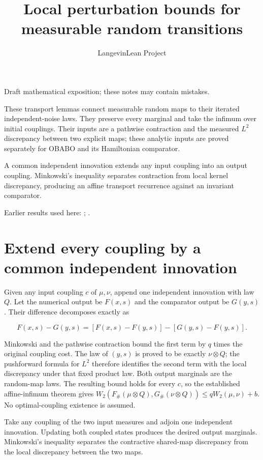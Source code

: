 \documentclass[11pt,a4paper]{article}
\title{\texorpdfstring{Local perturbation bounds for measurable random transitions}{Local perturbation bounds for measurable random transitions}}
\author{LangevinLean Project}
\date{}
\begin{document}
\maketitle
Draft mathematical exposition; these notes may contain mistakes.


These transport lemmas connect measurable random maps to their iterated independent-noise laws. They preserve every marginal and take the infimum over initial couplings. Their inputs are a pathwise contraction and the measured \(L^{2}\) discrepancy between two explicit maps; these analytic inputs are proved separately for OBABO and its Hamiltonian comparator.



A common independent innovation extends any input coupling into an output coupling. Minkowski’s inequality separates contraction from local kernel discrepancy, producing an affine transport recurrence against an invariant comparator.



Earlier results used here: \cite[Section~3.15]{LangevinLean2026ULASC}; \cite[Section~3.33]{LangevinLean2026ULASC}.

\section{\texorpdfstring{Extend every coupling by a common independent innovation}{Extend every coupling by a common independent innovation}}


Given any input coupling \(c\) of \(\mu,\nu\), append one independent innovation with law \(Q\). Let the numerical output be \(F(x,s)\) and the comparator output be \(G(y,s)\). Their difference decomposes exactly as

\[F(x,s)-G(y,s)=[F(x,s)-F(y,s)]-[G(y,s)-F(y,s)].\]

Minkowski and the pathwise contraction bound the first term by \(q\) times the original coupling cost. The law of \((y,s)\) is proved to be exactly \(\nu\otimes Q\); the pushforward formula for \(L^{2}\) therefore identifies the second term with the local discrepancy under that fixed product law. Both output marginals are the random-map laws. The resulting bound holds for every \(c\), so the established affine-infimum theorem gives \(W_2(F_\#(\mu\otimes Q),G_\#(\nu\otimes Q))\le qW_2(\mu,\nu)+b\). No optimal-coupling existence is assumed.



Take any coupling of the two input measures and adjoin one independent innovation. Updating both coupled states produces the desired output marginals. Minkowski’s inequality separates the contractive shared-map discrepancy from the local discrepancy between the two maps.
\end{document}

